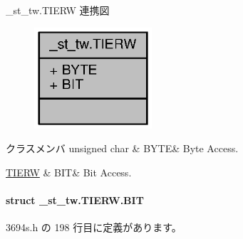 \+\_\+st\+\_\+tw.\+T\+I\+E\+R\+W 連携図
\nopagebreak
\begin{figure}[H]
\begin{center}
\leavevmode
\includegraphics[width=124pt]{de/da9/union__st__tw_8TIERW__coll__graph}
\end{center}
\end{figure}
\begin{DoxyFields}{クラスメンバ}
unsigned char\label{3694s_8h_ae409eb2ba6eb6801f52763ae370c350e}
&
B\+Y\+T\+E&
Byte Access. \\
\hline

\hyperlink{3694s_8h_db/d82/struct__st__tw_8TIERW_8BIT}{T\+I\+E\+R\+W}\label{3694s_8h_adb957fdc8000e1eef04a243f5199aa52}
&
B\+I\+T&
Bit Access. \\
\hline

\end{DoxyFields}
\label{struct__st__tw_8TIERW_8BIT}
\paragraph{struct \+\_\+st\+\_\+tw.\+T\+I\+E\+R\+W.\+B\+I\+T}


 3694s.\+h の 198 行目に定義があります。



